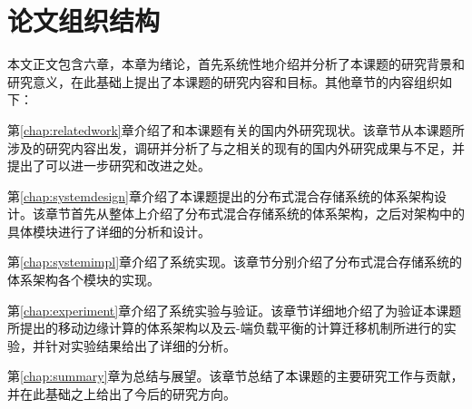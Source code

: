 \section{论文组织结构}
本文正文包含六章，本章为绪论，首先系统性地介绍并分析了本课题的研究背景和研究意义，在此基础上提出了本课题的研究内容和目标。其他章节的内容组织如下：

第\ref{chap:relatedwork}章介绍了和本课题有关的国内外研究现状。该章节从本课题所涉及的研究内容出发，调研并分析了与之相关的现有的国内外研究成果与不足，并提出了可以进一步研究和改进之处。

第\ref{chap:systemdesign}章介绍了本课题提出的分布式混合存储系统的体系架构设计。该章节首先从整体上介绍了分布式混合存储系统的体系架构，之后对架构中的具体模块进行了详细的分析和设计。

第\ref{chap:systemimpl}章介绍了系统实现。该章节分别介绍了分布式混合存储系统的体系架构各个模块的实现。

第\ref{chap:experiment}章介绍了系统实验与验证。该章节详细地介绍了为验证本课题所提出的移动边缘计算的体系架构以及云-端负载平衡的计算迁移机制所进行的实验，并针对实验结果给出了详细的分析。

第\ref{chap:summary}章为总结与展望。该章节总结了本课题的主要研究工作与贡献，并在此基础之上给出了今后的研究方向。
